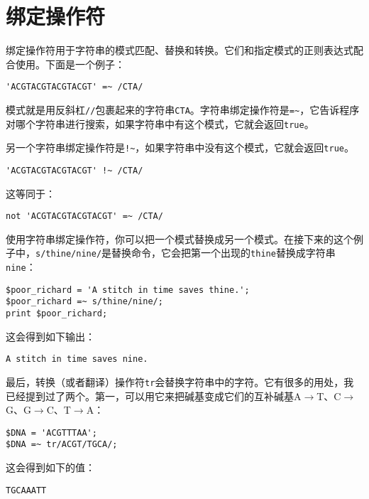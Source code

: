 \section{绑定操作符}
绑定操作符用于字符串的模式匹配、替换和转换。它们和指定模式的正则表达式配合使用。下面是一个例子：

\begin{lstlisting}
'ACGTACGTACGTACGT' =~ /CTA/
\end{lstlisting}

模式就是用反斜杠\verb|//|包裹起来的字符串\verb|CTA|。字符串绑定操作符是\verb|=~|，它告诉程序对哪个字符串进行搜索，如果字符串中有这个模式，它就会返回\verb|true|。

另一个字符串绑定操作符是\verb|!~|，如果字符串中没有这个模式，它就会返回\verb|true|。

\begin{lstlisting}
'ACGTACGTACGTACGT' !~ /CTA/
\end{lstlisting}

这等同于：

\begin{lstlisting}
not 'ACGTACGTACGTACGT' =~ /CTA/
\end{lstlisting}

使用字符串绑定操作符，你可以把一个模式替换成另一个模式。在接下来的这个例子中，\verb|s/thine/nine/|是替换命令，它会把第一个出现的\verb|thine|替换成字符串\verb|nine|：

\begin{lstlisting}
$poor_richard = 'A stitch in time saves thine.';
$poor_richard =~ s/thine/nine/;
print $poor_richard;
\end{lstlisting}

这会得到如下输出：

\begin{lstlisting}
A stitch in time saves nine.
\end{lstlisting}

最后，转换（或者翻译）操作符\verb|tr|会替换字符串中的字符。它有很多的用处，我已经提到过了两个。第一，可以用它来把碱基变成它们的互补碱基A$\rightarrow$T、C$\rightarrow$G、G$\rightarrow$C、T$\rightarrow$A：

\begin{lstlisting}
$DNA = 'ACGTTTAA';
$DNA =~ tr/ACGT/TGCA/;
\end{lstlisting}

这会得到如下的值：

\begin{lstlisting}
TGCAAATT
\end{lstlisting}


